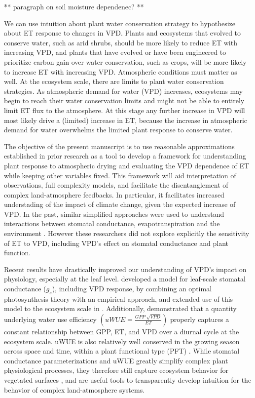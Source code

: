 ** paragraph on soil moisture dependenec? **

We can use intuition about plant water conservation strategy to
hypothesize about ET response to changes in VPD. Plants and ecosystems
that evolved to conserve water, such as arid shrubs, should be more
likely to reduce ET with increasing VPD, and plants that have evolved
or have been engineered to prioritize carbon gain over water
conservation, such as crops, will be more likely to increase ET with
increasing VPD. Atmospheric conditions must matter as well. At the
ecosystem scale, there are limits to plant water conservation
strategies. As atmospheric demand for water (VPD) increases,
ecosystems may begin to reach their water conservation limits and
might not be able to entirely limit ET flux to the atmosphere. At this
stage any further increase in VPD will most likely drive a (limited)
increase in ET, because the increase in atmospheric demand for water
overwhelms the limited plant response to conserve water.

The objective of the present manuscript is to use reasonable
approximations established in prior research as a tool to develop a
framework for understanding plant response to atmospheric drying and
evaluating the VPD dependence of ET while keeping other variables
fixed. This framework will aid interpretation of observations, full
complexity models, and facilitate the disentanglement of complex
land-atmosphere feedbacks. In particular, it facilitates increased
understading of the impact of climate change, given the expected
increase of VPD.  In the past, similar simplified approaches were used
to understand interactions between stomatal conductance,
evapotranspiration and the environment \citep[e.g.,][]{Jarvis_1984,
Jarvis_1986, Mcnaughton_1991}. However these researchers did not
explore explicitly the sensitivity of ET to VPD, including VPD's
effect on stomatal conductance and plant function.

Recent results have drastically improved our understanding of VPD's
impact on physiology, especially at the leaf
level. \citet{MEDLYN_2011} developed a model for leaf-scale stomatal
conductance ($g_s$), including VPD response, by combining an optimal
photosynthesis theory \citep{Cowan_1977, Katul_2009, Katul_2010} with an empirical
approach, and extended use of this model to the ecosystem scale in
\citet{Medlyn_2017}. Additionally, \citet{Zhou_2014} demonstrated that
a quantity underlying water use efficiency $\left(uWUE = \frac{GPP\;
\sqrt{VPD}}{ET}\right)$ properly captures a constant relationship
between GPP, ET, and VPD over a diurnal cycle at the ecosystem
scale. uWUE is also relatively well conserved in the growing season
across space and time, within a plant functional type (PFT)
\citep{Zhou_2015}.  While stomatal conductance parameterizations and
uWUE greatly simplify complex plant physiological processes, they
therefore still capture ecosystem behavior for vegetated surfaces
\citep{Medlyn_2017, Zhou_2014}, and are useful tools to transparently
develop intuition for the behavior of complex land-atmosphere systems.

